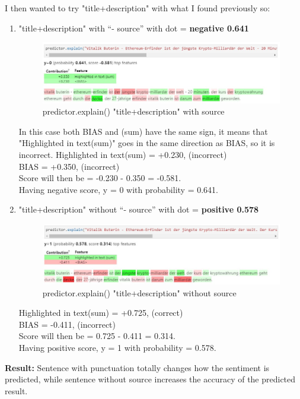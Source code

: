 I then wanted to try "title+description" with what I found previously so:
\begin{enumerate}
    \item "title+description" with “- source” with dot = \textbf{negative 0.641}
        \begin{figure}[H]
\centering
\includegraphics[width=1\textwidth]{images/5text.jpg}
\caption{predictor.explain() "title+description" with source}
\label{fig:fig_005}
\end{figure}
\FloatBarrier
In this case both BIAS and (sum) have the same sign, it means that "Highlighted in text(sum)" goes in the same direction as BIAS, so it is incorrect.
Highlighted in text(sum) = +0.230, (incorrect)\\
BIAS = +0.350, (incorrect)\\
Score will then be = -0.230 - 0.350 = -0.581.\\
Having negative score, y = 0 with probability = 0.641.
    \item "title+description" without “- source” with dot = \textbf{positive 0.578}
        \begin{figure}[H]
\centering
\includegraphics[width=1\textwidth]{images/6text.jpg}
\caption{predictor.explain() "title+description" without source}
\label{fig:fig_006}
\end{figure}
\FloatBarrier
Highlighted in text(sum) = +0.725, (correct)\\
BIAS = -0.411, (incorrect)\\
Score will then be = 0.725 - 0.411 = 0.314.\\
Having positive score, y = 1 with probability = 0.578.
\end{enumerate}

\textbf{Result:} Sentence with punctuation totally changes how the sentiment is predicted, while sentence without source increases the accuracy of the predicted result.

